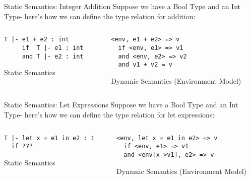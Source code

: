 \documentclass{beamer}
\begin{document}
    \begin{frame}[fragile]{Static Semantics: Integer Addition}
    Suppose we have a Bool Type and an Int Type- here's how we can define the type relation for addition:
    \begin{columns}
        \begin{column}{0.48\textwidth}
\begin{verbatim}
T |- e1 + e2 : int
     if  T |- e1 : int
     and T |- e2 : int
\end{verbatim}
    Static Semantics
        \end{column}
        \begin{column}{0.48\textwidth}
\begin{verbatim}
<env, e1 + e2> => v
  if <env, e1> => v1
  and <env, e2> => v2
  and v1 + v2 = v
\end{verbatim}
    Dynamic Semantics (Environment Model)
        \end{column}
    \end{columns}
    \end{frame}
    
    \begin{frame}[fragile]{Static Semantics: Let Expressions}
    Suppose we have a Bool Type and an Int Type- here's how we can define the type relation for let expressions:
    \begin{columns}
        \begin{column}{0.48\textwidth}
\begin{verbatim}
T |- let x = e1 in e2 : t
  if ???
\end{verbatim}
    Static Semantics
        \end{column}
        \begin{column}{0.48\textwidth}
\begin{verbatim}
<env, let x = e1 in e2> => v
  if <env, e1> => v1
  and <env[x->v1], e2> => v
\end{verbatim}
    Dynamic Semantics (Environment Model)
        \end{column}
    \end{columns}
    \end{frame}
    
\end{document}
